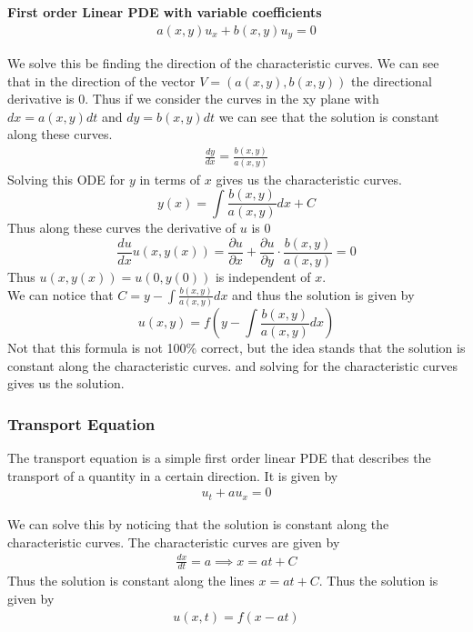 \documentclass[answers,12pt,addpoints]{exam}
\begin{document}
    \begin{example}
        \textbf{First order Linear PDE with variable coefficients}
        \begin{align*}
            a(x, y)u_x + b(x, y)u_y = 0
        \end{align*}
        \begin{solution}
            We solve this be finding the direction of the characteristic curves. We can see that in the direction of the vector $V = (a(x, y), b(x, y))$ the directional derivative is 0. Thus if we consider the curves in the xy plane with $dx = a(x, y)dt$ and $dy = b(x, y)dt$ we can see that the solution is constant along these curves. 
            \begin{align*}
                \frac{dy}{dx} = \frac{b(x, y)}{a(x, y)}
            \end{align*}
            Solving this ODE for $y$ in terms of $x$ gives us the characteristic curves.\\
            $$y(x) = \int \frac{b(x, y)}{a(x, y)} dx + C$$
            Thus along these curves the derivative of $u$ is 0
            $$ \frac{du}{dx} u(x, y(x)) = \frac{\partial u}{\partial x} + \frac{\partial u}{\partial y} \cdot \frac{b(x,y)}{a(x,y)} =0$$
            Thus $u(x, y(x)) = u(0, y(0))$ is independent of $x$. \\
            We can notice that $C = y - \int \frac{b(x, y)}{a(x, y)} dx$ and thus the solution is given by
            $$ u(x, y) = f(y - \int \frac{b(x, y)}{a(x, y)} dx)$$
            Not that this formula is not 100\% correct, but the idea stands that the solution is constant along the characteristic curves. and solving for the characteristic curves gives us the solution.
        \end{solution}
    \end{example}
    \subsubsection{Transport Equation}
    The transport equation is a simple first order linear PDE that describes the transport of a quantity in a certain direction. It is given by
    \begin{align*}
        u_t + au_x = 0
    \end{align*}
    \begin{solution}
        We can solve this by noticing that the solution is constant along the characteristic curves. The characteristic curves are given by
        \begin{align*}
            \frac{dx}{dt} = a \implies x = at + C
        \end{align*}
        Thus the solution is constant along the lines $x = at + C$. Thus the solution is given by
        \begin{align*}
            u(x, t) = f(x - at)
        \end{align*}
    \end{solution}
\end{document}
